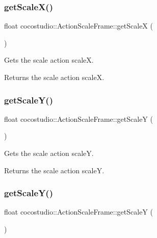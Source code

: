 \subsubsection{\texorpdfstring{get\+Scale\+X()}{getScaleX()}\hspace{0.1cm}{\footnotesize\ttfamily [2/2]}}
{\footnotesize\ttfamily float cocostudio\+::\+Action\+Scale\+Frame\+::get\+ScaleX (\begin{DoxyParamCaption}{ }\end{DoxyParamCaption})}

Gets the scale action scaleX.

\begin{DoxyReturn}{Returns}
the scale action scaleX. 
\end{DoxyReturn}
\mbox{\label{classcocostudio_1_1ActionScaleFrame_a792904e90d31dce42e7e70c553f9173c}} 
\subsubsection{\texorpdfstring{get\+Scale\+Y()}{getScaleY()}\hspace{0.1cm}{\footnotesize\ttfamily [1/2]}}
{\footnotesize\ttfamily float cocostudio\+::\+Action\+Scale\+Frame\+::get\+ScaleY (\begin{DoxyParamCaption}{ }\end{DoxyParamCaption})}

Gets the scale action scaleY.

\begin{DoxyReturn}{Returns}
the scale action scaleY. 
\end{DoxyReturn}
\mbox{\label{classcocostudio_1_1ActionScaleFrame_a792904e90d31dce42e7e70c553f9173c}} 
\subsubsection{\texorpdfstring{get\+Scale\+Y()}{getScaleY()}\hspace{0.1cm}{\footnotesize\ttfamily [2/2]}}
{\footnotesize\ttfamily float cocostudio\+::\+Action\+Scale\+Frame\+::get\+ScaleY (\begin{DoxyParamCaption}{ }\end{DoxyParamCaption})}

